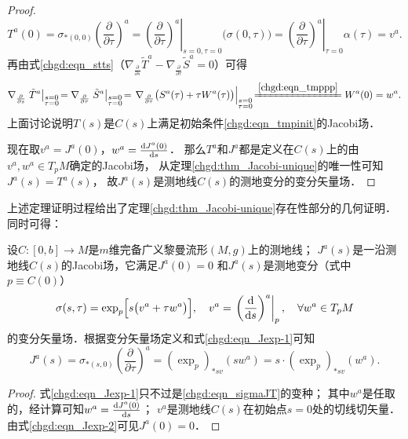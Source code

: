 \begin{proof}
    \begin{equation*}
        T^a(0)=\sigma_{*(0,0)}\left(\frac{\partial}{\partial \tau}\right)^a
        = \left.\left(\frac{\partial}{\partial \tau}\right)^a  \right|_{s=0,\tau=0} \bigl(\sigma(0,\tau)\bigr)
        = \left.\left(\frac{\partial}{\partial \tau}\right)^a  \right|_{\tau=0}\alpha(\tau) = v^a.
    \end{equation*}
    再由式\eqref{chgd:eqn_stts}（$ \nabla_{\frac{\partial}{\partial s}}\tilde{T}^a
    - \nabla_{\frac{\partial}{\partial \tau}}\tilde{S}^a =0$）可得
    \begin{equation*}
        \nabla_{\frac{\partial}{\partial s}} \left.\tilde{T}^a \right|_{\substack{s=0\\ \tau=0}} \!
        =\nabla_{\frac{\partial}{\partial \tau}} \left.\tilde{S}^a \right|_{\substack{s=0\\ \tau=0}} \!
        =\left. \nabla_{\frac{\partial}{\partial \tau}}\bigl(S^a(\tau)+ \tau W^a(\tau) \bigr)
         \right|_{\substack{s=0\\ \tau=0}}\! \xlongequal{\ref{chgd:eqn_tmppp}} W^a(0) =w^a .
    \end{equation*}
    上面讨论说明$T(s)$是$C(s)$上满足初始条件\eqref{chgd:eqn_tmpinit}的Jacobi场．

    现在取$v^a=J^a(0)$，$w^a=\frac{{\rm d}J^a(0)}{{\rm d} s}$．
    那么$T^a$和$J^a$都是定义在$C(s)$上的由$v^a,w^a\in T_pM$确定的Jacobi场，
    从定理\ref{chgd:thm_Jacobi-unique}的唯一性可知$J^a(s)=T^a(s)$，
    故$J^a(s)$是测地线$C(s)$的测地变分的变分矢量场．
\end{proof}

上述定理证明过程给出了定理\ref{chgd:thm_Jacobi-unique}存在性部分的几何证明．
同时可得：
\begin{corollary}\label{chgd:thm_Jexp}
    设$C:[0,b]\to M$是$m$维完备广义黎曼流形$(M,g)$上的测地线；
    $J^a(s)$是一沿测地线$C(s)$的Jacobi场，它满足$J^a(0)=0$
    和$J^a(s)$是测地变分（式中$p\equiv C(0)$）
    \begin{equation}\label{chgd:eqn_Jexp-1}
        \sigma(s,\tau)= \exp_{p}\Bigl[s\bigl(v^a+\tau w^a\bigr)\Bigr],
        \quad v^a = \left.\left(\frac{\rm{d}}{{\rm d} s}\right)^a \right|_{p},
        \quad \forall w^a \in T_{p} M 
    \end{equation}
    的变分矢量场．根据变分矢量场定义和式\eqref{chgd:eqn_Jexp-1}可知
    \begin{equation}\label{chgd:eqn_Jexp-2}
        J^a(s)= \sigma_{*(s,0)}\left(\frac{\partial}{\partial \tau}\right)^a
        =  (\exp_{p})_{* s v} (sw^a) =s\cdot (\exp_{p})_{* s v} ( w^a) .
    \end{equation}    
\end{corollary}
\begin{proof}
    式\eqref{chgd:eqn_Jexp-1}只不过是\eqref{chgd:eqn_sigmaJT}的变种；
    其中$w^a$是任取的，经计算可知$ w^a = \frac{{\rm d}J^a(0)}{{\rm d}s}$；
    $v^a$是测地线$C(s)$在初始点$s=0$处的切线切矢量．
    由式\eqref{chgd:eqn_Jexp-2}可见$J^a(0)=0$．
\end{proof}



